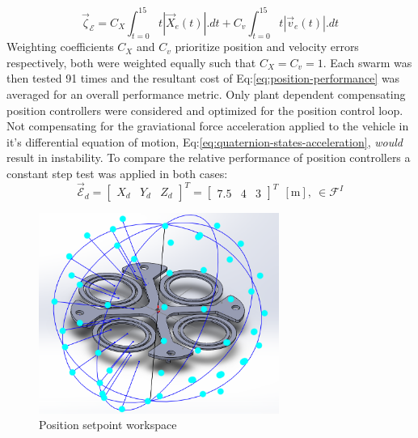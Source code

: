 \begin{equation}\label{eq:position-performance}
\vec{\zeta}_{\mathcal{E}}=C_{X}\int_{t=0}^{15}t|\vec{X}_e(t)|.dt+C_{v}\int_{t=0}^{15}t|\vec{v}_e(t)|.dt
\end{equation}
Weighting coefficients $C_X$ and $C_v$ prioritize position and velocity errors respectively, both were weighted equally such that $C_X=C_v=1$. Each swarm was then tested 91 times and the resultant cost of Eq:\ref{eq:position-performance} was averaged for an overall performance metric. Only plant dependent compensating position controllers were considered and optimized for the position control loop. Not compensating for the graviational force acceleration applied to the vehicle in it's differential equation of motion, Eq:\ref{eq:quaternion-states-acceleration}, \emph{would} result in instability. To compare the relative performance of position controllers a constant step test was applied in both cases:
\begin{equation}\label{eq:position-step}
\vec{\mathcal{E}}_d=\begin{bmatrix}
X_d&
Y_d&
Z_d
\end{bmatrix}^T=\begin{bmatrix}
7.5&
4&
3
\end{bmatrix}^T~~[\text{m}],~\in\mathcal{F}^{I}
\end{equation}
\par
\begin{figure}[htbp]
\centering
\includegraphics[width=0.7\textwidth]{figs/position-setpoint}
\caption{Position setpoint workspace}
\label{fig:position-setpoint}
\end{figure}
\par
